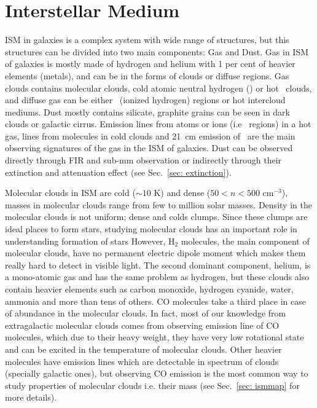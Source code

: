 \section{Interstellar Medium}
\label{sec: ism_intro}
ISM in galaxies is a complex system with wide range of structures, but this structures can be divided into two main components: Gas and Dust.
Gas in ISM of galaxies is mostly made of hydrogen and helium with 1 per cent of heavier elements (metals), and can be in the forms of clouds or diffuse regions.
Gas clouds contains molecular clouds, cold atomic neutral hydrogen (\hi) or hot \hi~clouds, and diffuse gas can be either \hii~(ionized hydrogen) regions or hot intercloud mediums.
Dust mostly contains silicate, graphite grains can be seen in dark clouds or galactic cirrus.
Emission lines from atoms or ions (i.e \hii~regions) in a hot gas, lines from molecules in cold clouds and 21~cm emission of \hi~are the main observing signatures of the gas in the ISM of galaxies.
Dust can be observed directly through FIR and sub-mm observation or indirectly through their extinction and attenuation effect (see Sec.~\ref{sec: extinction}).

Molecular clouds in ISM are cold ($\sim10$ K) and dense ($ 50<n<500$ cm$^{-3}$), masses in molecular clouds range from few to million solar masses. %
Density in the molecular clouds is not uniform; dense and colds clumps.
Since these clumps are ideal places to form stars, studying molecular clouds has an important role in understanding formation of stars
However, H$_2$ molecules, the main component of molecular clouds, have no permanent electric dipole moment which makes them really hard to detect in visible light.
The second dominant component, helium, is a mono-atomic gas and has the same problem as hydrogen, but these clouds also contain heavier elements such as carbon monoxide, hydrogen cyanide, water, ammonia and more than tens of others.
CO molecules take a third place in case of abundance in the molecular clouds.
In fact, most of our knowledge from extragalactic molecular clouds comes from observing emission line of CO molecules, which due to their heavy weight, they have very low rotational state and can be excited in the temperature of molecular clouds. 
Other heavier molecules have emission lines which are detectable in spectrum of clouds (specially galactic ones), but observing CO emission is the most common way to study properties of molecular clouds i.e. their mass (see Sec.~\ref{sec: ismmap} for more details).

